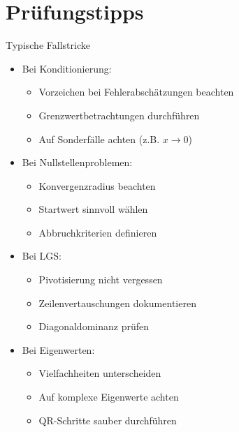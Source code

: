 \section{Prüfungstipps}

\begin{concept}{Typische Fallstricke}
\begin{itemize}
    \item Bei Konditionierung:
    \begin{itemize}
        \item Vorzeichen bei Fehlerabschätzungen beachten
        \item Grenzwertbetrachtungen durchführen
        \item Auf Sonderfälle achten (z.B. $x \to 0$)
    \end{itemize}
    
    \item Bei Nullstellenproblemen:
    \begin{itemize}
        \item Konvergenzradius beachten
        \item Startwert sinnvoll wählen
        \item Abbruchkriterien definieren
    \end{itemize}
    
    \item Bei LGS:
    \begin{itemize}
        \item Pivotisierung nicht vergessen
        \item Zeilenvertauschungen dokumentieren
        \item Diagonaldominanz prüfen
    \end{itemize}
    
    \item Bei Eigenwerten:
    \begin{itemize}
        \item Vielfachheiten unterscheiden
        \item Auf komplexe Eigenwerte achten
        \item QR-Schritte sauber durchführen
    \end{itemize}
\end{itemize}
\end{concept}

